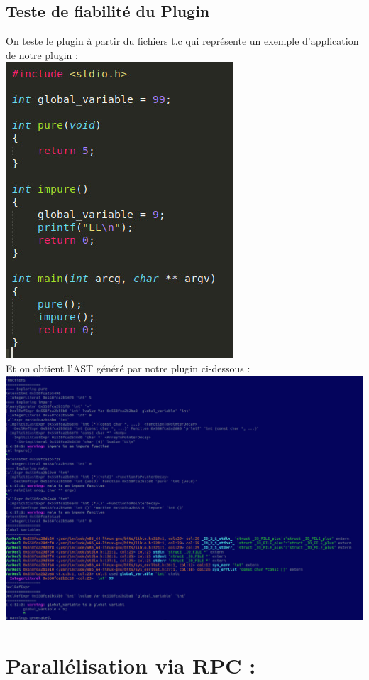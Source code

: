 \documentclass[12pt,titlepage]{article}
\begin{document}
\subsection{Teste de fiabilité du Plugin}
On teste le plugin à partir du fichiers t.c qui représente un exemple d'application de notre plugin : \\
\includegraphics[scale=0.4]{test.jpg} \\[0.2cm]
Et on obtient l'AST généré par notre plugin ci-dessous :\\
\includegraphics[scale=0.4]{AST.jpg} \\[0.2cm]

\section{Parallélisation via RPC : }
\end{document}
